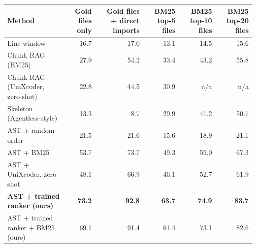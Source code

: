 \begin{tabular}{lrrrrr}
\toprule
Method & Gold files only & Gold files + direct imports & BM25 top-5 files & BM25 top-10 files & BM25 top-20 files \\
\midrule
Line window & 16.7 & 17.0 & 13.1 & 14.5 & 15.6 \\
Chunk RAG (BM25) & 27.9 & 54.2 & 33.4 & 43.2 & 55.8 \\
Chunk RAG (UniXcoder, zero-shot) & 22.8 & 44.5 & 30.9 & n/a & n/a \\
Skeleton (Agentless-style) & 13.3 & 8.7 & 29.9 & 41.2 & 50.7 \\
AST + random order & 21.5 & 21.6 & 15.6 & 18.9 & 21.1 \\
AST + BM25 & 53.7 & 73.7 & 49.3 & 59.0 & 67.3 \\
AST + UniXcoder, zero-shot & 48.1 & 66.9 & 46.1 & 52.7 & 61.9 \\
\textbf{AST + trained ranker (ours)} & \textbf{73.2} & \textbf{92.8} & \textbf{63.7} & \textbf{74.9} & \textbf{83.7} \\
AST + trained ranker + BM25 (ours) & 69.1 & 91.4 & 61.4 & 73.1 & 82.6 \\
\bottomrule
\end{tabular}
